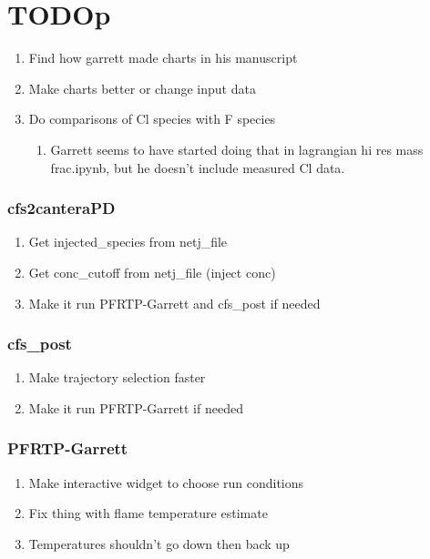 \documentclass{article}
\begin{document}
\section*{TODOp}
\begin{enumerate}
    \item Find how garrett made charts in his manuscript 
    \item Make charts better or change input data
    \item Do comparisons of Cl species with F species
    \begin{enumerate}
        \item Garrett seems to have started doing that in lagrangian hi res mass frac.ipynb, but he doesn't include measured Cl data.
    \end{enumerate}
\end{enumerate}

\subsubsection*{cfs2canteraPD}
\begin{enumerate}
    \item Get injected\_species from netj\_file
    \item Get conc\_cutoff from netj\_file (inject conc)
    \item Make it run PFRTP-Garrett and cfs\_post if needed
\end{enumerate}

\subsubsection*{cfs\_post}
\begin{enumerate}
    \item Make trajectory selection faster
    \item Make it run PFRTP-Garrett if needed
\end{enumerate}

\subsubsection*{PFRTP-Garrett}
\begin{enumerate}
    \item Make interactive widget to choose run conditions
    \item Fix thing with flame temperature estimate
    \item Temperatures shouldn't go down then back up
\end{enumerate}
\end{document}

